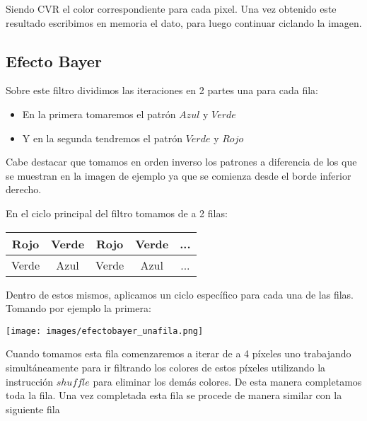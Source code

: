 Siendo CVR el color correspondiente para cada pixel.
Una vez obtenido este resultado escribimos en memoria el dato, para luego continuar ciclando la imagen. 


\subsection{Efecto Bayer}

Sobre este filtro dividimos las iteraciones en 2 partes una para cada fila:

\begin{itemize}
  \item En la primera tomaremos el patrón $Azul$ y $Verde$
  \item Y en la segunda tendremos el patrón $Verde$ y $Rojo$
\end{itemize}

Cabe destacar que tomamos en orden inverso los patrones a diferencia de los que se muestran en la imagen de ejemplo ya que se comienza desde el borde inferior derecho.

En el ciclo principal del filtro tomamos de a 2 filas:


\begin{table}[h]
\begin{center}
\begin{tabular}{|c|c|c|c|c|}
\hline
 Rojo   & Verde &  Rojo   & Verde & ...    \\ \hline
 Verde  & Azul & Verde  & Azul & ...   \\ \hline
\end{tabular}
\end{center}
\end{table}

Dentro de estos mismos, aplicamos un ciclo específico para cada una de las filas. Tomando por ejemplo la primera:

\vspace{6px}
\begin{center}
\texttt{[image: images/efectobayer\_unafila.png]}
\end{center}
\vspace{6px}

Cuando tomamos esta fila comenzaremos a iterar de a 4 píxeles uno trabajando simultáneamente para ir filtrando los colores de estos píxeles utilizando la instrucción $shuffle$ para eliminar los demás colores. De esta manera completamos toda la fila.
Una vez completada esta fila se procede de manera similar con la siguiente fila 


